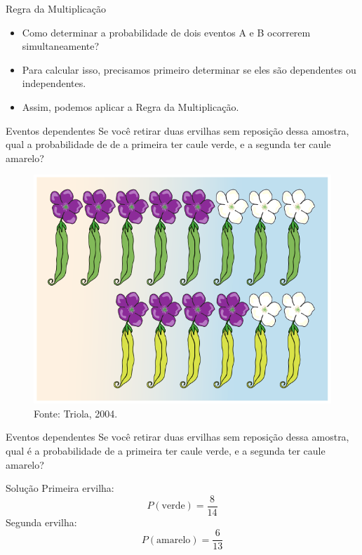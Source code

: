 \documentclass{beamer}
\begin{document}
\begin{frame}{Regra da Multiplicação}
  \begin{itemize}
  \item Como determinar a probabilidade de dois eventos A e B
    ocorrerem simultaneamente?
  \item Para calcular isso, precisamos primeiro determinar se eles são
    \alert{dependentes} ou \alert{independentes}.
  \item Assim, podemos aplicar a Regra da Multiplicação.
  \end{itemize}
\end{frame}

\begin{frame}{Eventos dependentes}
  Se você retirar duas ervilhas \alert{sem reposição} dessa amostra,
  qual a probabilidade de de a primeira ter caule verde, e a segunda
  ter caule amarelo?
  \begin{figure}
    \centering
    \includegraphics[height=0.5\textheight]{Prob_I/ervilhas-genetica}
    \caption{Fonte: Triola, 2004.}
  \end{figure}
\end{frame}

\begin{frame}{Eventos dependentes}
  Se você retirar duas ervilhas \alert{sem reposição} dessa amostra,
  qual é a probabilidade de a primeira ter caule verde, e a segunda
  ter caule amarelo?  
\bigskip
\bigskip
\bigskip
  \begin{block}{Solução}
    Primeira ervilha:
    \begin{displaymath}
      P(\text{verde}) = \frac{8}{14}
    \end{displaymath}
    Segunda ervilha:
    \begin{displaymath}
      P(\text{amarelo}) = \frac{6}{13}
    \end{displaymath}
  \end{block}
\end{frame}
\end{document}
